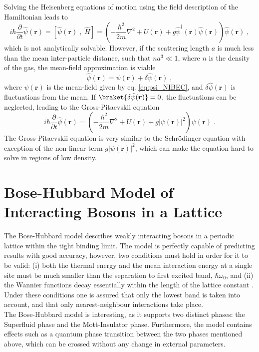 Solving the Heisenberg equations of motion using the field description of the Hamiltonian leads to
\begin{equation}
	i \hbar \frac{\partial }{\partial t} \hat{\psi}(\boldsymbol{r}) = \left[ \hat{\psi}(\boldsymbol{r}) \; , \; \hat{H}  \right] = \left( - \frac{\hbar^2}{2 m} \nabla^2 + U(\boldsymbol{r}) + g \hat{\psi}^{\dag}(\boldsymbol{r}) \hat{\psi}(\boldsymbol{r}) \right) \hat{\psi}(\boldsymbol{r}) \; ,
\end{equation}
which is not analytically solvable. However, if the scattering length $a$ is much less than the mean inter-particle distance, such that $n a^3 \ll 1$, where $n$ is the density of the gas, the mean-field approximation is viable
\begin{equation}
	\hat{\psi}(\boldsymbol{r}) = \psi(\boldsymbol{r}) + \delta \hat{\psi}(\boldsymbol{r}) \; ,
\end{equation}
where $\psi(\boldsymbol{r})$ is the mean-field given by eq. \eqref{eq:psi_NIBEC}, and $\delta \hat{\psi}(\boldsymbol{r})$ is fluctuations from the mean. If $\braket{\delta \hat{\psi}(\boldsymbol{r})} = 0$, the fluctuations can be neglected, leading to the Gross-Pitaevskii equation \cite{Gross1961,Pitaevskii}
\begin{equation}
	i \hbar \frac{\partial }{\partial t} \hat{\psi}(\boldsymbol{r}) = \left( - \frac{\hbar^2}{2 m} \nabla^2 + U(\boldsymbol{r}) + g |\psi(\boldsymbol{r})|^2 \right) \psi(\boldsymbol{r}) \; .
\end{equation}
The Gross-Pitaevskii equation is very similar to the Schrödinger equation with exception of the non-linear term $g |\psi(\boldsymbol{r})|^2$, which can make the equation hard to solve in regions of low density.



\section{Bose-Hubbard Model of Interacting Bosons in a Lattice} \label{sec:BHmodel}
The Bose-Hubbard model describes weakly interacting bosons in a periodic lattice within the tight binding limit. The model is perfectly capable of predicting results with good accuracy, however, two conditions must hold in order for it to be valid: (i) both the thermal energy and the mean interaction energy at a single site must be much smaller than the separation to first excited band, $\hbar \omega_0$, and (ii) the Wannier functions decay essentially within the length of the lattice constant \cite{manybodyBloch}.
Under these conditions one is assured that only the lowest band is taken into account, and that only nearest-neighbour interactions take place.\\
The Bose-Hubbard model is interesting, as it supports two distinct phases: the Superfluid phase and the Mott-Insulator phase. Furthermore, the model contains effects such as a quantum phase transition between the two phases mentioned above, which can be crossed without any change in external parameters. 


